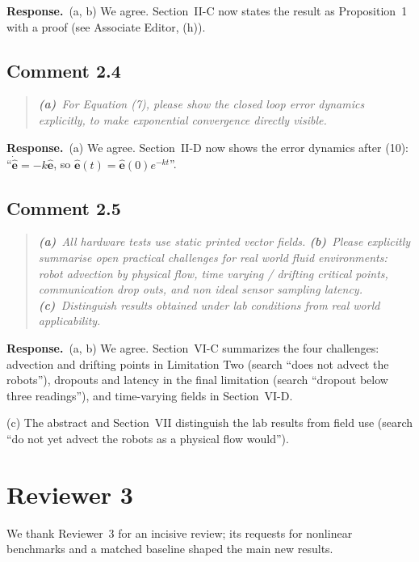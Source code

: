 \documentclass[10pt]{article}
\newcommand{\resp}{\par\textbf{Response.}~}
\begin{document}
\resp (a, b) We agree. Section~II-C now states the result as Proposition~1 with a proof (see Associate Editor, (h)).

\subsection*{Comment 2.4}

\begin{quote}\itshape
\textbf{(a)}~For Equation (7), please show the closed loop error dynamics explicitly, to make exponential convergence directly visible.
\end{quote}

\resp (a) We agree. Section~II-D now shows the error dynamics after (10): ``$\dot{\hat{\mathbf{e}}} = -k\hat{\mathbf{e}}$, so $\hat{\mathbf{e}}(t) = \hat{\mathbf{e}}(0)e^{-kt}$''.

\subsection*{Comment 2.5}

\begin{quote}\itshape
\textbf{(a)}~All hardware tests use static printed vector fields.
\textbf{(b)}~Please explicitly summarise open practical challenges for real world fluid environments: robot advection by physical flow, time varying / drifting critical points, communication drop outs, and non ideal sensor sampling latency.
\textbf{(c)}~Distinguish results obtained under lab conditions from real world applicability.
\end{quote}

\resp (a, b) We agree. Section~VI-C summarizes the four challenges: advection and drifting points in Limitation Two (search ``does not advect the robots''), dropouts and latency in the final limitation (search ``dropout below three readings''), and time-varying fields in Section~VI-D.

(c) The abstract and Section~VII distinguish the lab results from field use (search ``do not yet advect the robots as a physical flow would'').

\section*{Reviewer 3}

We thank Reviewer~3 for an incisive review; its requests for nonlinear benchmarks and a matched baseline shaped the main new results.
\end{document}
